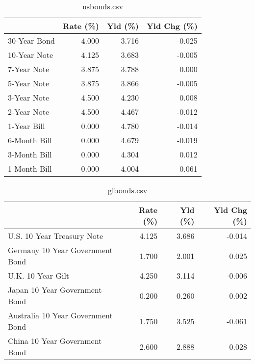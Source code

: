 \documentclass{article}%
\begin{document}
%


\begin{table}[htbp]%
\caption{usbonds.csv}%
\centering%
\begin{adjustbox}{width=1\textwidth}%
\begin{tabular}{lrrr}
\toprule
             &  Rate (\%) &  Yld (\%) &  Yld Chg (\%) \\
\midrule
30-Year Bond &     4.000 &    3.716 &       -0.025 \\
10-Year Note &     4.125 &    3.683 &       -0.005 \\
 7-Year Note &     3.875 &    3.788 &        0.000 \\
 5-Year Note &     3.875 &    3.866 &       -0.005 \\
 3-Year Note &     4.500 &    4.230 &        0.008 \\
 2-Year Note &     4.500 &    4.467 &       -0.012 \\
 1-Year Bill &     0.000 &    4.780 &       -0.014 \\
6-Month Bill &     0.000 &    4.679 &       -0.019 \\
3-Month Bill &     0.000 &    4.304 &        0.012 \\
1-Month Bill &     0.000 &    4.004 &        0.061 \\
\bottomrule
\end{tabular}
%
\end{adjustbox}%
\end{table}

%


\begin{table}[htbp]%
\caption{glbonds.csv}%
\centering%
\begin{adjustbox}{width=1\textwidth}%
\begin{tabular}{lrrr}
\toprule
                                  &  Rate (\%) &  Yld (\%) &  Yld Chg (\%) \\
\midrule
       U.S. 10 Year Treasury Note &     4.125 &    3.686 &       -0.014 \\
  Germany 10 Year Government Bond &     1.700 &    2.001 &        0.025 \\
                U.K. 10 Year Gilt &     4.250 &    3.114 &       -0.006 \\
    Japan 10 Year Government Bond &     0.200 &    0.260 &       -0.002 \\
Australia 10 Year Government Bond &     1.750 &    3.525 &       -0.061 \\
    China 10 Year Government Bond &     2.600 &    2.888 &        0.028 \\
\bottomrule
\end{tabular}
%
\end{adjustbox}%
\end{table}
\end{document}
